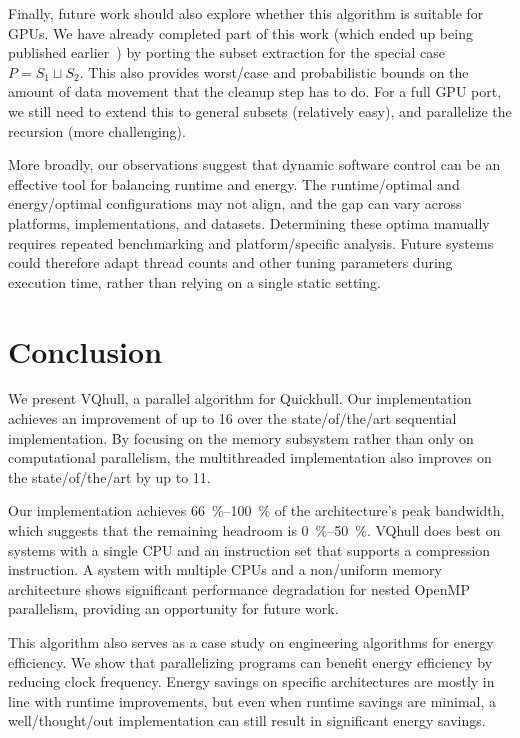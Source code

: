 Finally, future work should also explore whether this algorithm is suitable for GPUs.
We have already completed part of this work (which ended up being published earlier~\cite{koopman2025partitioning}) by porting the subset extraction for the special case $P = S_1 \sqcup S_2$.
This also provides worst\-/case and probabilistic bounds on the amount of data movement that the cleanup step has to do.
For a full GPU port, we still need to extend this to general subsets (relatively easy), and parallelize the recursion (more challenging).

More broadly, our observations suggest that dynamic software control can be an effective tool for balancing runtime and energy.
The runtime\-/optimal and energy\-/optimal configurations may not align, and the gap can vary across platforms, implementations, and datasets.
Determining these optima manually requires repeated benchmarking and platform\-/specific analysis.
Future systems could therefore adapt thread counts and other tuning parameters during execution time, rather than relying on a single static setting.

\section{Conclusion}
We present VQhull, a parallel algorithm for Quickhull.
Our implementation achieves an improvement of up to \qty{16}{\times} over the state\-/of\-/the\-/art sequential implementation.
By focusing on the memory subsystem rather than only on computational parallelism, the multithreaded implementation also improves on the state\-/of\-/the\-/art by up to \qty{11}{\times}.

Our implementation achieves \qtyrange{66}{100}{\percent} of the architecture's peak bandwidth, which suggests that the remaining headroom is \qtyrange{0}{50}{\percent}.
VQhull does best on systems with a single CPU and an instruction set that supports a compression instruction.
A system with multiple CPUs and a non\-/uniform memory architecture shows significant performance degradation for nested OpenMP parallelism, providing an opportunity for future work.

This algorithm also serves as a case study on engineering algorithms for energy efficiency.
We show that parallelizing programs can benefit energy efficiency by reducing clock frequency.
Energy savings on specific architectures are mostly in line with runtime improvements, but even when runtime savings are minimal, a well\-/thought\-/out implementation can still result in significant energy savings.
